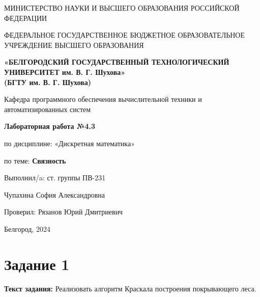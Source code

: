 \documentclass[12pt]{article}
\begin{document}
	\begin{center}
		{\parskip=1cm
			МИНИСТЕРСТВО НАУКИ И ВЫСШЕГО ОБРАЗОВАНИЯ РОССИЙСКОЙ ФЕДЕРАЦИИ
			
			ФЕДЕРАЛЬНОЕ ГОСУДАРСТВЕННОЕ БЮДЖЕТНОЕ ОБРАЗОВАТЕЛЬНОЕ УЧРЕЖДЕНИЕ ВЫСШЕГО ОБРАЗОВАНИЯ
			
			{\bf«БЕЛГОРОДСКИЙ ГОСУДАРСТВЕННЫЙ ТЕХНОЛОГИЧЕСКИЙ УНИВЕРСИТЕТ им. В. Г. Шухова»\\(БГТУ им. В. Г. Шухова)}
			
			\begin{figure}[bh]
				\noindent{}
			\end{figure}
			Кафедра программного обеспечения вычислительной техники и автоматизированных систем
		}
		
		{\Large 
			\vspace{1cm}
			{\parskip=0.25cm 
				{\bf Лабораторная работа №4.3}
				
				по дисциплине: «Дискретная математика»
				
				по теме: {\bf Связность}
			}
		}
	\end{center}	
	\begin{flushleft}
		{\leftskip=10cm
			{\vspace{3cm} Выполнил/a: ст. группы ПВ-231}
			
			Чупахина София Александровна
			
			Проверил: Рязанов Юрий Дмитриевич
			
		}
	\end{flushleft}
	\begin{center}
		{\parskip=3cm Белгород, 2024}
	\end{center}
	\newpage

	\tableofcontents
	
	\newpage
	
	\section{Задание 1}
	\label{task1}
	{\bf Текст задания:} Реализовать алгоритм Краскала построения покрывающего леса. 
	
\end{document}
